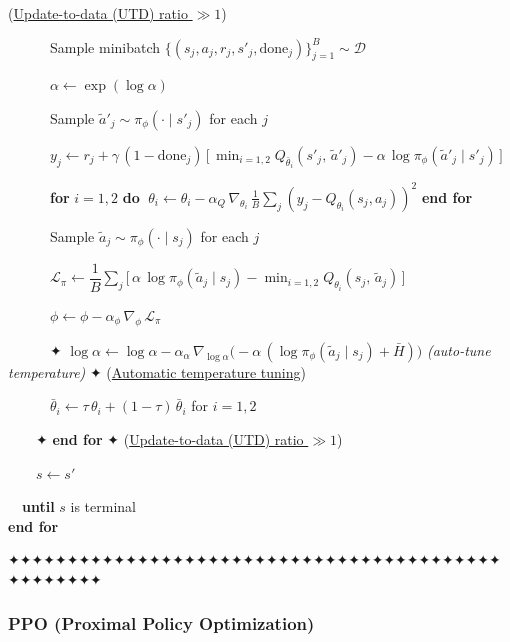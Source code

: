 \documentclass[11pt]{article}
\begin{document}
\begin{pseudobox}
(\hyperref[trick-4-6-2]{Update-to-data (UTD) ratio \(\gg 1\)})\\
\strut ~~~~~~Sample minibatch
\(\{(s_j, a_j, r_j, s'_j, \text{done}_j)\}_{j=1}^{B} \sim \mathcal{D}\)\\
\strut ~~~~~~\(\alpha \leftarrow \exp(\log\alpha)\)\\
\strut ~~~~~~Sample \(\tilde{a}'_j \sim \pi_\phi(\cdot \mid s'_j)\) for
each \(j\)\\
\strut ~~~~~~\(y_j \leftarrow r_j + \gamma\,(1 - \text{done}_j)\,\bigl[\, \min_{i = 1, 2} Q_{\bar{\theta}_i}(s'_j,\, \tilde{a}'_j) - \alpha\, \log \pi_\phi(\tilde{a}'_j \mid s'_j) \,\bigr]\)\\
\strut ~~~~~~\textbf{for} \(i = 1, 2\) \textbf{do}
\(\;\theta_i \leftarrow \theta_i - \alpha_Q\, \nabla_{\theta_i}\, \frac{1}{B}\sum_j(y_j - Q_{\theta_i}(s_j, a_j))^{2}\)
\textbf{end for}\\
\strut ~~~~~~Sample \(\tilde{a}_j \sim \pi_\phi(\cdot \mid s_j)\) for
each \(j\)\\
\strut ~~~~~~\(\mathcal{L}_\pi \leftarrow \dfrac{1}{B} \sum_j \bigl[\, \alpha\, \log \pi_\phi(\tilde{a}_j \mid s_j) - \min_{i = 1, 2} Q_{\theta_i}(s_j,\, \tilde{a}_j) \,\bigr]\)\\
\strut ~~~~~~\(\phi \leftarrow \phi - \alpha_\phi\, \nabla_{\phi}\, \mathcal{L}_\pi\)\\
\strut ~~~~~~✦
\(\log\alpha \leftarrow \log\alpha - \alpha_\alpha\, \nabla_{\log\alpha}\bigl(-\alpha\,(\log\pi_\phi(\tilde{a}_j \mid s_j) + \bar{H})\bigr)\)
\emph{(auto-tune temperature)} ✦ (\hyperref[trick-4-6-1]{Automatic
temperature tuning})\\
\strut ~~~~~~\(\bar{\theta}_i \leftarrow \tau\, \theta_i + (1 - \tau)\, \bar{\theta}_i\)
for \(i = 1, 2\)\\
\strut ~~~~✦ \textbf{end for} ✦ (\hyperref[trick-4-6-2]{Update-to-data
(UTD) ratio \(\gg 1\)})\\
\strut ~~~~\(s \leftarrow s'\)\\
\strut ~~\textbf{until} \(s\) is terminal\\
\textbf{end for}

\end{pseudobox}

    ✦✦✦✦✦✦✦✦✦✦✦✦✦✦✦✦✦✦✦✦✦✦✦✦✦✦✦✦✦✦✦✦✦✦✦✦✦✦✦✦✦✦✦✦✦✦✦✦✦✦

    \clearpage

\label{ppo}

    \subsubsection{PPO (Proximal Policy
Optimization)}\label{ppo-proximal-policy-optimization}
\end{document}
